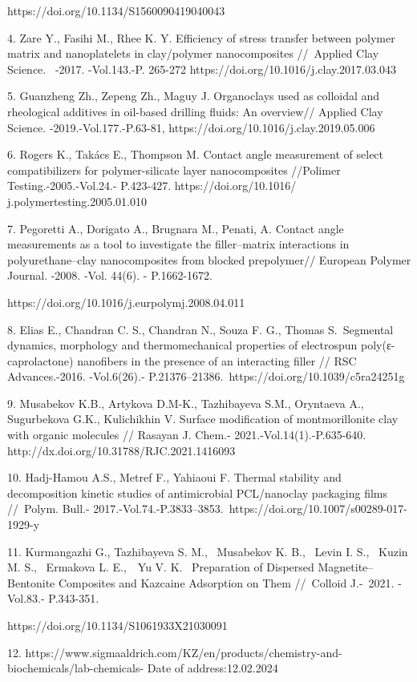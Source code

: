 https://doi.org/10.1134/S1560090419040043

4. Zare Y., Fasihi M., Rhee K. Y. Efficiency of stress transfer between
polymer matrix and nanoplatelets in clay/polymer nanocomposites
//~Applied Clay Science.~ -2017. -Vol.143.-P. 265-272
https://doi.org/10.1016/j.clay.2017.03.043

5. Guanzheng Zh., Zepeng Zh., Maguy J. Organoclays used as colloidal and
rheological additives in oil-based drilling fluids: An overview//
Applied Clay Science. -2019.-Vol.177.-P.63-81,
https://doi.org/10.1016/j.clay.2019.05.006

6. Rogers K., Takács E., Thompson M. Contact angle measurement of select
compatibilizers for polymer-silicate layer nanocomposites //Polimer
Testing.-2005.-Vol.24.- P.423-427. https://doi.org/10.1016/
j.polymertesting.2005.01.010

7. Pegoretti A., Dorigato A., Brugnara M., Penati, A. Contact angle
measurements as a tool to investigate the filler--matrix interactions in
polyurethane--clay nanocomposites from blocked prepolymer// European
Polymer Journal. -2008. -Vol. 44(6). - P.1662-1672.~

https://doi.org/10.1016/j.eurpolymj.2008.04.011

8. Elias E., Chandran C. S., Chandran N., Souza F. G., Thomas
S.~Segmental dynamics, morphology and thermomechanical properties of
electrospun poly(ε-caprolactone) nanofibers in the presence of an
interacting filler // RSC Advances.-2016. -Vol.6(26).-
P.21376--21386.~https://doi.org/10.1039/c5ra24251g

9. Musabekov K.B., Artykova D.M-K., Tazhibayeva S.M., Oryntaeva A.,
Sugurbekova G.K., Kulichikhin V. Surface modification of montmorillonite
clay with organic molecules // Rasayan J. Chem.-
2021.-Vol.14(1).-P.635-640. http://dx.doi.org/10.31788/RJC.2021.1416093

10. Hadj-Hamou A.S., Metref F., Yahiaoui F. Thermal stability and
decomposition kinetic studies of antimicrobial PCL/nanoclay packaging
films //~Polym. Bull.-
2017.-Vol.74.-P.3833--3853.~https://doi.org/10.1007/s00289-017-1929-y

11. Kurmangazhi G., Tazhibayeva S. M.,~ Musabekov K. B.,~ Levin I. S.,~
Kuzin M. S.,~ Ermakova L. E.,~~Yu V. K.~ Preparation of Dispersed
Magnetite--Bentonite Composites and Kazcaine Adsorption on Them
//~Colloid J.-~2021. -Vol.83.- P.343-351.

https://doi.org/10.1134/S1061933X21030091

12.
https://www.sigmaaldrich.com/KZ/en/products/chemistry-and-biochemicals/lab-chemicals-
Date of address:12.02.2024

